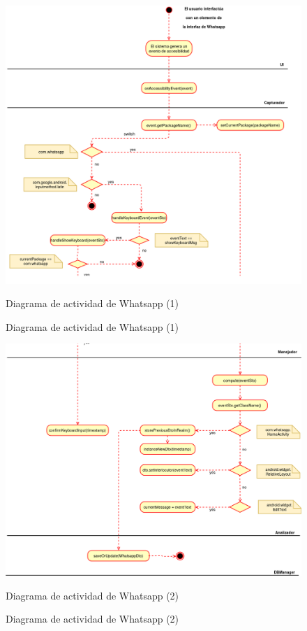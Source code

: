 \documentclass[12pt,a4paper,oneside]{book} %
\begin{document}
\begin{landscape}
\begin{figure}[htb]
	\begin{center}
     	\includegraphics[scale=0.4]{pictures/activity/whatsappActivityDiagram1.png}
	    	\caption{Diagrama de actividad de Whatsapp (1)}{Diagrama de actividad de Whatsapp (1)}
    	\label{fig:Diagrama de actividad Whatsapp (1)}
	\end{center}
\end{figure}
\end{landscape}
\begin{landscape}
\begin{figure}[htb]
	\begin{center}
     	\includegraphics[scale=0.4]{pictures/activity/whatsappActivityDiagram2.png}
	    	\caption{Diagrama de actividad de Whatsapp (2)}{Diagrama de actividad de Whatsapp (2)}
    	\label{fig:Diagrama de actividad Whatsapp (2)}
	\end{center}
\end{figure}
\end{landscape}
\end{document}
